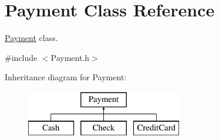 \hypertarget{classPayment}{}\section{Payment Class Reference}
\label{classPayment}


\hyperlink{classPayment}{Payment} class.  




{\ttfamily \#include $<$Payment.\+h$>$}

Inheritance diagram for Payment\+:\begin{figure}[H]
\begin{center}
\leavevmode
\includegraphics[height=2.000000cm]{classPayment}
\end{center}
\end{figure}
